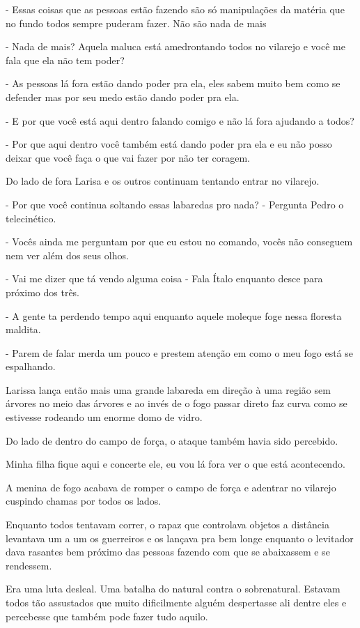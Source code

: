 - Essas coisas que as pessoas estão fazendo são só manipulações da matéria que no fundo todos sempre puderam fazer. Não são nada de mais

- Nada de mais? Aquela maluca está amedrontando todos no vilarejo e você me fala que ela não tem poder?

- As pessoas lá fora estão dando poder pra ela, eles sabem muito bem como se defender mas por seu medo estão dando poder pra ela.

- E por que você está aqui dentro falando comigo e não lá fora ajudando a todos?

- Por que aqui dentro você também está dando poder pra ela e eu não posso deixar que você faça o que vai fazer por não ter coragem.

Do lado de fora Larisa e os outros continuam tentando entrar no vilarejo.

- Por que você continua soltando essas labaredas pro nada? - Pergunta Pedro o telecinético.

- Vocês ainda me perguntam por que eu estou no comando, vocês não conseguem nem ver além dos seus olhos.

- Vai me dizer que tá vendo alguma coisa - Fala Ítalo enquanto desce para próximo dos três.

- A gente ta perdendo tempo aqui enquanto aquele moleque foge nessa floresta maldita.

- Parem de falar merda um pouco e prestem atenção em como o meu fogo está se espalhando.

Larissa lança então mais uma grande labareda em direção à uma região sem árvores no meio das árvores e ao invés de o fogo passar direto faz curva como se estivesse rodeando um enorme domo de vidro.

Do lado de dentro do campo de força, o ataque também havia sido percebido.

Minha filha fique aqui e concerte ele, eu vou lá fora ver o que está acontecendo.

A menina de fogo acabava de romper o campo de força e adentrar no vilarejo cuspindo chamas por todos os lados.

Enquanto todos tentavam correr, o rapaz que controlava objetos a distância levantava um a um os guerreiros e os lançava pra bem longe enquanto o levitador dava rasantes bem próximo das pessoas fazendo com que se abaixassem e se rendessem.

Era uma luta desleal. Uma batalha do natural contra o sobrenatural. Estavam todos tão assustados que muito dificilmente alguém despertasse ali dentre eles e percebesse que também pode fazer tudo aquilo.

